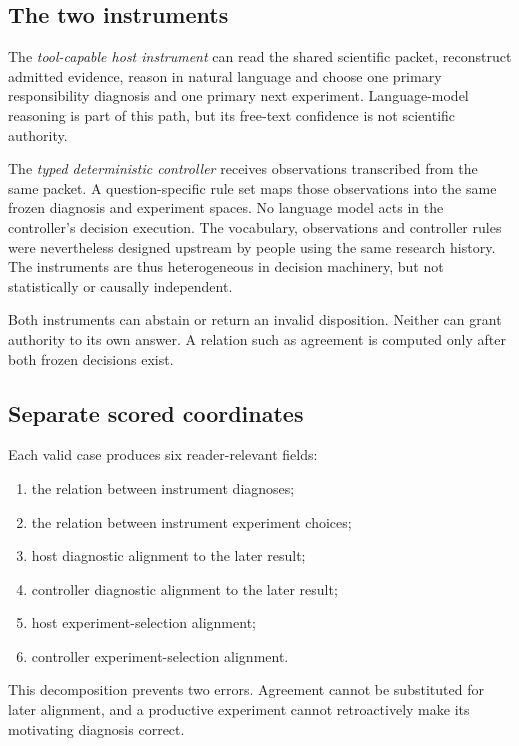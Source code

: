\documentclass[10pt]{article}
\begin{document}
\subsection{The two instruments}

The \emph{tool-capable host instrument} can read the shared scientific packet, reconstruct admitted evidence, reason in natural language and choose one primary responsibility diagnosis and one primary next experiment. Language-model reasoning is part of this path, but its free-text confidence is not scientific authority.

The \emph{typed deterministic controller} receives observations transcribed from the same packet. A question-specific rule set maps those observations into the same frozen diagnosis and experiment spaces. No language model acts in the controller's decision execution. The vocabulary, observations and controller rules were nevertheless designed upstream by people using the same research history. The instruments are thus heterogeneous in decision machinery, but not statistically or causally independent.

Both instruments can abstain or return an invalid disposition. Neither can grant authority to its own answer. A relation such as agreement is computed only after both frozen decisions exist.

\subsection{Separate scored coordinates}

Each valid case produces six reader-relevant fields:

\begin{enumerate}
\item the relation between instrument diagnoses;
\item the relation between instrument experiment choices;
\item host diagnostic alignment to the later result;
\item controller diagnostic alignment to the later result;
\item host experiment-selection alignment;
\item controller experiment-selection alignment.
\end{enumerate}

This decomposition prevents two errors. Agreement cannot be substituted for later alignment, and a productive experiment cannot retroactively make its motivating diagnosis correct.
\end{document}

